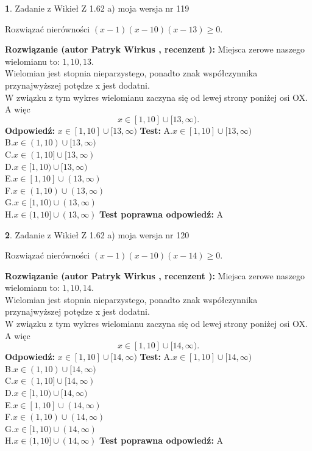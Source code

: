 \documentclass[12pt, a4paper]{article}
\theoremstyle{definition} %
\newtheorem{zad}{}
\newcommand{\zadStart}[1]{\begin{zad}#1\newline}
\newcommand{\zadStop}{\end{zad}}
\newcommand{\rozwStart}[2]{\noindent \textbf{Rozwiązanie (autor #1 , recenzent #2): }\newline}
\newcommand{\rozwStop}{\newline}
\newcommand{\odpStart}{\noindent \textbf{Odpowiedź:}\newline}
\newcommand{\odpStop}{\newline}
\newcommand{\testStart}{\noindent \textbf{Test:}\newline}
\newcommand{\testStop}{\newline}
\newcommand{\kluczStart}{\noindent \textbf{Test poprawna odpowiedź:}\newline}
\newcommand{\kluczStop}{\newline}
\begin{document}
\zadStart{Zadanie z Wikieł Z 1.62 a) moja wersja nr 119}

Rozwiązać nierówności $(x-1)(x-10)(x-13)\ge0$.
\zadStop
\rozwStart{Patryk Wirkus}{}
Miejsca zerowe naszego wielomianu to: $1, 10, 13$.\\
Wielomian jest stopnia nieparzystego, ponadto znak współczynnika przy\linebreak najwyższej potędze x jest dodatni.\\ W związku z tym wykres wielomianu zaczyna się od lewej strony poniżej osi OX. A więc $$x \in [1,10] \cup [13,\infty).$$
\rozwStop
\odpStart
$x \in [1,10] \cup [13,\infty)$
\odpStop
\testStart
A.$x \in [1,10] \cup [13,\infty)$\\
B.$x \in (1,10) \cup [13,\infty)$\\
C.$x \in (1,10] \cup [13,\infty)$\\
D.$x \in [1,10) \cup [13,\infty)$\\
E.$x \in [1,10] \cup (13,\infty)$\\
F.$x \in (1,10) \cup (13,\infty)$\\
G.$x \in [1,10) \cup (13,\infty)$\\
H.$x \in (1,10] \cup (13,\infty)$
\testStop
\kluczStart
A
\kluczStop



\zadStart{Zadanie z Wikieł Z 1.62 a) moja wersja nr 120}

Rozwiązać nierówności $(x-1)(x-10)(x-14)\ge0$.
\zadStop
\rozwStart{Patryk Wirkus}{}
Miejsca zerowe naszego wielomianu to: $1, 10, 14$.\\
Wielomian jest stopnia nieparzystego, ponadto znak współczynnika przy\linebreak najwyższej potędze x jest dodatni.\\ W związku z tym wykres wielomianu zaczyna się od lewej strony poniżej osi OX. A więc $$x \in [1,10] \cup [14,\infty).$$
\rozwStop
\odpStart
$x \in [1,10] \cup [14,\infty)$
\odpStop
\testStart
A.$x \in [1,10] \cup [14,\infty)$\\
B.$x \in (1,10) \cup [14,\infty)$\\
C.$x \in (1,10] \cup [14,\infty)$\\
D.$x \in [1,10) \cup [14,\infty)$\\
E.$x \in [1,10] \cup (14,\infty)$\\
F.$x \in (1,10) \cup (14,\infty)$\\
G.$x \in [1,10) \cup (14,\infty)$\\
H.$x \in (1,10] \cup (14,\infty)$
\testStop
\kluczStart
A
\kluczStop
\end{document}

